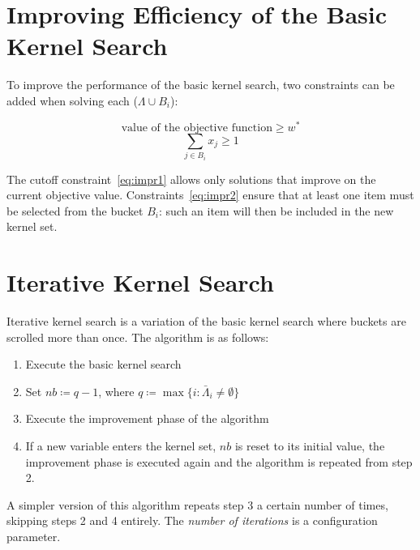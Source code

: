 \section{Improving Efficiency of the Basic Kernel Search}\label{sec:improving-efficiency}
To improve the performance of the basic kernel search, two constraints can be added
when solving each (\(\Lambda \cup B_{i}\)):

\begin{equation}
    \label{eq:impr1}
    \text{value of the objective function} \geq w^{*}
\end{equation}
\begin{equation}
    \label{eq:impr2}
    \sum_{j \in B_{i}} x_{j} \geq 1
\end{equation}

The cutoff constraint~\eqref{eq:impr1} allows only solutions that improve on the current
objective value.
Constraints~\eqref{eq:impr2} ensure that at least one item must be selected from the bucket \(B_{i}\):
such an item will then be included in the new kernel set.


\section{Iterative Kernel Search}\label{sec:iter}
Iterative kernel search is a variation of the basic kernel search where buckets are scrolled more than once.
The algorithm is as follows:
\begin{enumerate}
    \item Execute the basic kernel search
    \item Set \(nb \coloneqq q-1\), where \(q \coloneqq \max\{i:\bar{\Lambda}_{i} \neq \emptyset\}\)
    \item Execute the improvement phase of the algorithm
    \item If a new variable enters the kernel set, \(nb\) is reset to its initial value,
    the improvement phase is executed again and the algorithm is repeated from step 2.
\end{enumerate}

A simpler version of this algorithm repeats step 3 a certain number of times,
skipping steps 2 and 4 entirely.
The \textit{number of iterations} is a configuration parameter.